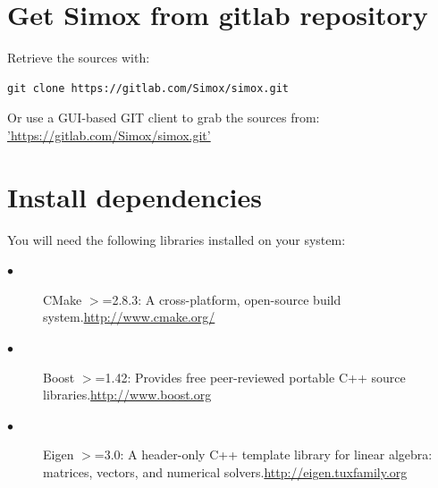 \section{Get Simox from gitlab repository}
Retrieve the sources with: 
\begin{lstlisting}
git clone https://gitlab.com/Simox/simox.git
\end{lstlisting}
Or use a GUI-based GIT client to grab the sources from: 
\hyperref[simox gitlab]{'https://gitlab.com/Simox/simox.git'}
\section{Install dependencies}
You will need the following libraries installed on your system: 

\begin{description}
\item[$\bullet$ ] CMake $>$=2.8.3: A cross-platform, open-source build system.\hyperref[cmake]{http://www.cmake.org/} 
\item[$\bullet$ ] Boost $>$=1.42: Provides free peer-reviewed portable C++ source libraries.\hyperref[boost]{http://www.boost.org} 
\item[$\bullet$ ] Eigen $>$=3.0: A header-only C++ template library for linear algebra: matrices, vectors, and numerical solvers.\hyperref[Eigen]{http://eigen.tuxfamily.org} 
\end{description}
